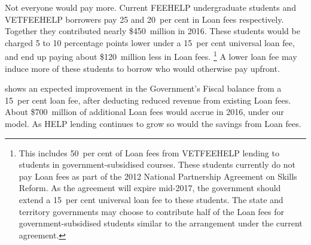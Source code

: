 \documentclass[embargoed]{grattan}
\begin{document}
Not everyone would pay more.
Current \gls{FEEHELP} undergraduate students and \gls{VETFEEHELP} borrowers pay 25 and 20~per cent in \gls{Loan fees} respectively.
Together they contributed nearly \$450~million in 2016.
These students would be charged 5 to 10 percentage points lower under a 15~per cent universal loan fee, and end up paying about \$120~million less in \gls{Loan fees}.%
\footnote{This includes 50~per cent of \gls{Loan fees} from \gls{VETFEEHELP} lending to students in government-subsidised courses.
These students currently do not pay \gls{Loan fees} as part of the 2012 National Partnership Agreement on Skills Reform.
As the agreement will expire mid-2017, the government should extend a 15~per cent universal loan fee to these students.
The state and territory governments may choose to contribute half of the \gls{Loan fees} for government-subsidised students similar to the arrangement under the current agreement.} A lower loan fee may induce more of these students to borrow who would otherwise pay upfront.

 shows an expected improvement in the Government's \gls{Fiscal balance} from a 15~per cent loan fee, after deducting reduced revenue from existing \gls{Loan fees}.
About \$700~million of additional \gls{Loan fees} would accrue in 2016, under our model.
As \gls{HELP} lending continues to grow so would the savings from \gls{Loan fees}.
\end{document}
